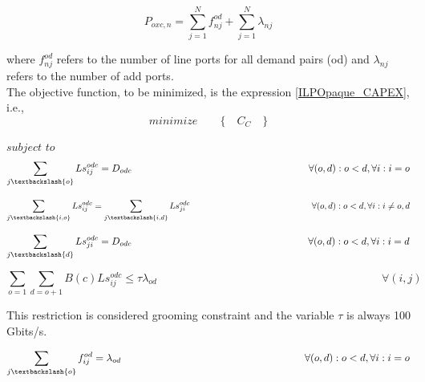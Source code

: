 \begin{equation}
P_{oxc,n} = \sum_{j=1}^{N} f_{nj}^{od} + \sum_{j=1}^{N} \lambda_{nj}
\label{OXC_poxc_transluc}
\end{equation}

\vspace{11pt}
\noindent
where $f_{nj}^{od}$ refers to the number of line ports for all demand pairs (od) and $\lambda_{nj}$ refers to the number of add ports.\\

The objective function, to be minimized, is the expression \ref{ILPOpaque_CAPEX}, i.e.,
\begin{equation*}
  minimize \qquad \Big\{ \quad C_C \quad \Big\}
\end{equation*}

$subject$ $to$
\begin{equation}
\sum_{j\textbackslash \{o\}} Ls_{ij}^{odc} = D_{odc}  \qquad \qquad \qquad \qquad \qquad \qquad \qquad \qquad \qquad
\forall(o,d) : o < d, \forall i: i = o
\label{ILPTransluc1}
\end{equation}

\begin{equation}
\sum_{j\textbackslash \{i,o\}} Ls_{ij}^{odc} = \sum_{j\textbackslash \{i,d\}} Ls_{ji}^{odc} \qquad \qquad \qquad \qquad \qquad \qquad \qquad
\forall(o,d) : o < d, \forall i: i \neq o,d
\label{ILPTransluc2}
\end{equation}

\begin{equation}
\sum_{j\textbackslash \{d\}} Ls_{ji}^{odc} = D_{odc} \qquad \qquad \qquad \qquad \qquad \qquad \qquad \qquad \qquad
\forall(o,d) : o < d, \forall i: i = d
\label{ILPTransluc3}
\end{equation}

\begin{equation}
\sum_{o=1} \sum_{d=o+1} B(c) Ls_{ij}^{odc} \leq  \tau \lambda_{od} \qquad \qquad \qquad \qquad \qquad \qquad \qquad \qquad \qquad \qquad
\forall (i,j)
\label{ILPTransluc4}
\end{equation}

This restriction is considered grooming constraint and the variable $\tau$ is always 100 Gbits/s.

\begin{equation}
\sum_{j\textbackslash \{o\}} f_{ij}^{od} = \lambda_{od}  \qquad \qquad \qquad \qquad \qquad \qquad \qquad \qquad \qquad
\forall(o,d) : o < d, \forall i: i = o
\label{ILPTransluc6}
\end{equation}

